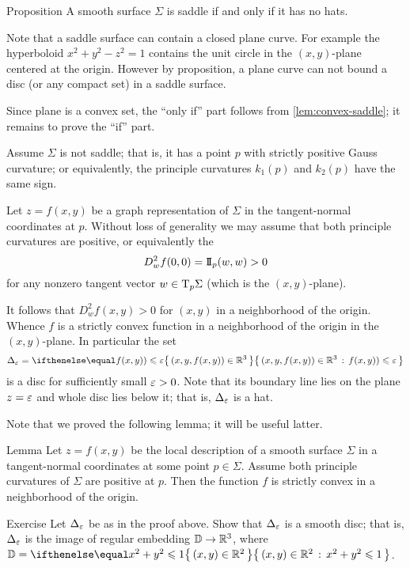 \begin{thm}{Proposition}\label{prop:hat}
A smooth surface $\Sigma$ is saddle if and only if it has no hats.
\end{thm}

Note that a saddle surface can contain a closed plane curve.
For example the hyperboloid $x^2+y^2-z^2=1$ contains the unit circle in the $(x,y)$-plane centered at the origin.
However by proposition, a plane curve can not bound a disc (or any compact set) in a saddle surface.

Since plane is a convex set, the ``only if'' part follows from \ref{lem:convex-saddle};
it remains to prove the ``if'' part.

Assume $\Sigma$ is not saddle; that is, it has a point $p$ with strictly positive Gauss curvature;
or equivalently, the principle curvatures $k_1(p)$ and $k_2(p)$ have the same sign.

Let $z=f(x,y)$ be a graph representation of $\Sigma$ in the tangent-normal coordinates at $p$.
Without loss of generality we may assume that both principle curvatures are positive,
or equivalently the 
\[D^2_wf(0,0)=\mathrm{I}\!\mathrm{I}_p(w,w)>0\] 
for any nonzero tangent vector $w\in\mathrm{T}_p\Sigma$ (which is the $(x,y)$-plane).

It follows that $D^2_wf(x,y)>0$ for $(x,y)$ in a neighborhood of the origin.
Whence $f$ is a strictly convex function in a neighborhood of the origin in the $(x,y)$-plane.
In particular the set 
\[\Delta_\eps=\set{(x,y,f(x,y))\in \RR^3}{f(x,y))\le \eps}\]
is a disc for sufficiently small $\varepsilon>0$. %
Note that its boundary line lies on the plane $z=\varepsilon$ and whole disc lies below it;
that is, $\Delta_\varepsilon$ is a hat.
\qeds

Note that we proved the following lemma; it will be useful latter.

\begin{thm}{Lemma}\label{lem:gauss+=>convexity}
Let $z=f(x,y)$ be the local description of a smooth surface $\Sigma$ in a tangent-normal coordinates at some point $p\in\Sigma$.
Assume both principle curvatures of $\Sigma$ are positive at $p$.
Then the function $f$ is strictly convex in a neighborhood of the origin.
\end{thm}


\begin{thm}{Exercise}
Let $\Delta_\varepsilon$ be as in the proof above.
Show that $\Delta_\varepsilon$ is a smooth disc; that is, $\Delta_\varepsilon$ is the image of regular embedding $\mathbb{D}\to \mathbb{R}^3$, where $\DD=\set{(x,y)\in\RR^2}{x^2+y^2\le 1}$.
\end{thm}

